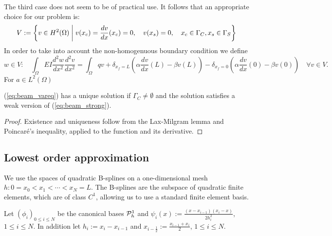 %
The third case does not seem to be of practical use.
It follows that an appropriate choice for our problem is:
%
\begin{equation}\label{eq:beam_V}
V:= \left\{v\in H^2(\Omega)\;\middle|\;v(x_c)=\frac{d v}{dx}(x_c)=0, \quad v(x_s)=0,\quad x_c\in\Gamma_C,x_s\in\Gamma_S\right\}
\end{equation}
%
%
In order to take into account the non-homogenuous boundary condition we define
%
\begin{equation}\label{eq:beam_vareq2}
w\in V:\quad \int_{\Omega} EI \frac{d^2 w}{dx^2}\frac{d^2 v}{dx^2}= \int_{\Omega} qv + 
\delta_{x_f=L}(\alpha\frac{d v}{dx}(L) - \beta v(L)) - \delta_{x_f=0}(\alpha\frac{d v}{dx}(0) - \beta v(0))\quad \forall v\in V.
\end{equation}
%
%
For $a\in L^2(\Omega)$
\begin{proposition}\label{prop:}
(\ref{eq:beam_vareq}) has a unique solution if $\Gamma_C\ne\emptyset$ and the solution satisfies a weak version of 
(\ref{eq:beam_strong}).
\end{proposition}
\begin{proof}
Existence and uniqueness follow from the Lax-Milgram lemma and Poincaré's inequality, applied to the function and its derivative.
\end{proof}
%
%
\subsection{Lowest order approximation}\label{subsec:}
%
We use the spaces of quadratic B-splines on a one-dimensional mesh $h:0=x_0<x_1<\cdots< x_N=L$. 
The B-splines are the subspace of quadratic finite elements, which are of class $C^1$, allowing us to use a  
standard finite element basis. 

Let $(\phi_i)_{0\le i\le N}$ be the canonical bases $\mathcal{P}^1_h$ and $\psi_i(x):=\frac{(x-x_{i-1})(x_i-x)}{2h_i^2}$, $1\le i\le N$.
In addition let $h_i:=x_i-x_{i-1}$ and $x_{i-\frac12}:= \frac{x_{i-1}+x_{i}}{2}$, $1\le i\le N$.

